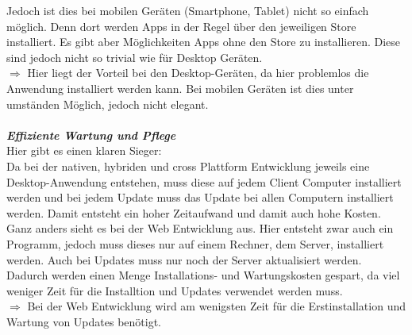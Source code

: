 \documentclass[ngerman]{article}
\begin{document}
    \indent Jedoch ist dies bei mobilen Geräten (Smartphone, Tablet) nicht so einfach möglich. Denn dort werden Apps in der Regel über den jeweiligen Store installiert. Es gibt aber Möglichkeiten Apps ohne den Store zu installieren. Diese sind jedoch nicht so trivial wie für Desktop Geräten.\\
    \indent $\Rightarrow$ Hier liegt der Vorteil bei den Desktop-Geräten, da hier problemlos die Anwendung installiert werden kann. Bei mobilen Geräten ist dies unter umständen Möglich, jedoch nicht elegant.\\\\
    \textbf{\textit{Effiziente Wartung und Pflege}}\\
    Hier gibt es einen klaren Sieger:\\
    \indent Da bei der nativen, hybriden und cross Plattform Entwicklung jeweils eine Desktop-Anwendung entstehen, muss diese auf jedem Client Computer installiert werden und bei jedem Update muss das Update bei allen Computern installiert werden. Damit entsteht ein hoher Zeitaufwand und damit auch hohe Kosten.\\
    \indent Ganz anders sieht es bei der Web Entwicklung aus. Hier entsteht zwar auch ein Programm, jedoch muss dieses nur auf einem Rechner, dem Server, installiert werden. Auch bei Updates muss nur noch der Server aktualisiert werden. Dadurch werden einen Menge Installations- und Wartungskosten gespart, da viel weniger Zeit für die Installtion und Updates verwendet werden muss.\\
    \indent$\Rightarrow$ Bei der Web Entwicklung wird am wenigsten Zeit für die Erstinstallation und Wartung von Updates benötigt.\\\\
\end{document}

